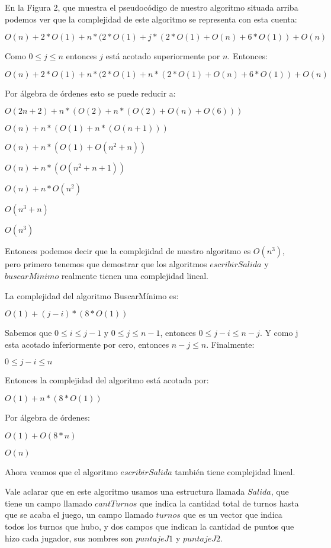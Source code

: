 En la Figura 2, que muestra el pseudocódigo de nuestro algoritmo situada arriba podemos ver que la complejidad de este algoritmo se representa con esta cuenta:

$O(n) + 2*O(1) + n*(2*O(1) + j*(2*O(1) +O(n) + 6*O(1)) + O(n)$

Como $0 \leq j \leq n$ entonces $j$ está acotado superiormente por $n$. Entonces:

$O(n) + 2*O(1) + n*(2*O(1) + n*(2*O(1) +O(n) + 6*O(1)) + O(n)$

Por álgebra de órdenes esto se puede reducir a:

$O(2n+2) + n*(O(2) + n*(O(2) + O(n) + O (6)))$

$O(n) + n*(O(1) + n*(O(n+1)))$

$O(n) + n*(O(1) + O(n^2+n))$

$O(n) + n*(O(n^2 +n +1))$

$O(n) + n*O(n^2)$

$O(n^3+n)$

$O(n^3)$

Entonces podemos decir que la complejidad de nuestro algoritmo es $O(n^3)$, pero primero tenemos que demostrar que los algoritmos $escribirSalida$ y $buscarMinimo$ realmente tienen una complejidad lineal.


La complejidad del algoritmo BuscarMínimo es:

$O(1) + (j-i)*(8*O(1))$

Sabemos que $0 \leq i \leq j-1$ y $0 \leq j \leq n-1$, entonces $0 \leq j-i \leq n-j$. Y como j esta acotado inferiormente por cero, entonces $n-j \leq n$. Finalmente:

$0 \leq j-i \leq n$

Entonces la complejidad del algoritmo está acotada por:

$O(1) + n*(8*O(1))$

Por álgebra de órdenes:

$O(1) + O(8*n)$

$O(n)$

Ahora veamos que el algoritmo $escribirSalida$ también tiene complejidad lineal.

Vale aclarar que en este algoritmo usamos una estructura llamada $Salida$, que tiene un campo llamado $cantTurnos$ que indica la cantidad total de turnos hasta que se acaba el juego, un campo llamado $turnos$ que es un vector que indica todos los turnos que hubo, y dos campos que indican la cantidad de puntos que hizo cada jugador, sus nombres son $puntajeJ1$ y $puntajeJ2$.

